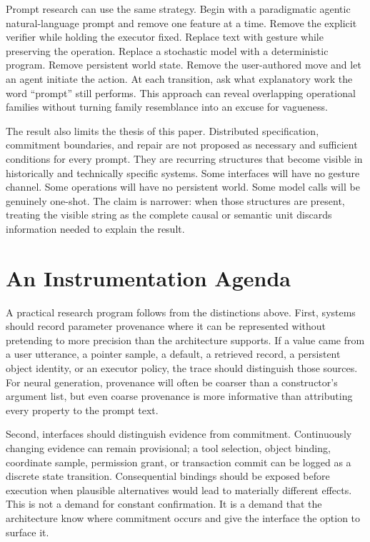 \documentclass[11pt]{article}
\begin{document}
Prompt research can use the same strategy. Begin with a paradigmatic agentic natural-language prompt and remove one feature at a time. Remove the explicit verifier while holding the executor fixed. Replace text with gesture while preserving the operation. Replace a stochastic model with a deterministic program. Remove persistent world state. Remove the user-authored move and let an agent initiate the action. At each transition, ask what explanatory work the word ``prompt'' still performs. This approach can reveal overlapping operational families without turning family resemblance into an excuse for vagueness.

The result also limits the thesis of this paper. Distributed specification, commitment boundaries, and repair are not proposed as necessary and sufficient conditions for every prompt. They are recurring structures that become visible in historically and technically specific systems. Some interfaces will have no gesture channel. Some operations will have no persistent world. Some model calls will be genuinely one-shot. The claim is narrower: when those structures are present, treating the visible string as the complete causal or semantic unit discards information needed to explain the result.

\section{An Instrumentation Agenda}

A practical research program follows from the distinctions above. First, systems should record parameter provenance where it can be represented without pretending to more precision than the architecture supports. If a value came from a user utterance, a pointer sample, a default, a retrieved record, a persistent object identity, or an executor policy, the trace should distinguish those sources. For neural generation, provenance will often be coarser than a constructor's argument list, but even coarse provenance is more informative than attributing every property to the prompt text.

Second, interfaces should distinguish evidence from commitment. Continuously changing evidence can remain provisional; a tool selection, object binding, coordinate sample, permission grant, or transaction commit can be logged as a discrete state transition. Consequential bindings should be exposed before execution when plausible alternatives would lead to materially different effects. This is not a demand for constant confirmation. It is a demand that the architecture know where commitment occurs and give the interface the option to surface it.
\end{document}
